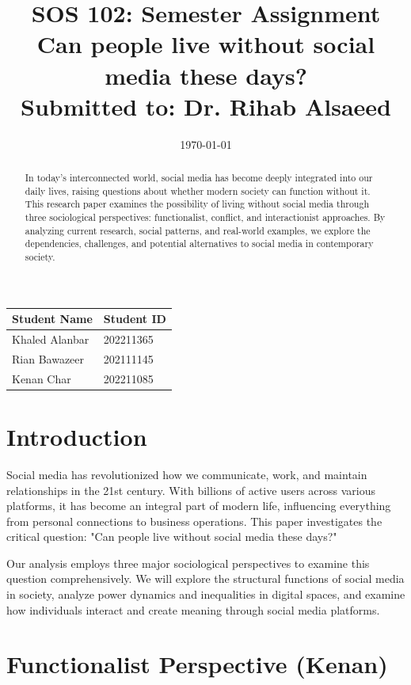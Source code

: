 \documentclass{article}
\title{SOS 102: Semester Assignment\\
\large Can people live without social media these days?\\
\vspace{0.5cm}
\normalsize Submitted to: Dr. Rihab Alsaeed}
\date{\today}
\begin{document}
\maketitle

\vspace{1cm}
\begin{center}
\begin{tabular}{|p{5cm}|p{5cm}|}
\hline
\textbf{Student Name} & \textbf{Student ID} \\
\hline
Khaled Alanbar & 202211365 \\
\hline
Rian Bawazeer & 202111145 \\
\hline
Kenan Char  & 202211085 \\
\hline
\end{tabular}
\end{center}
\newpage

\begin{abstract}
\noindent
In today's interconnected world, social media has become deeply integrated into our daily lives, raising questions about whether modern society can function without it. This research paper examines the possibility of living without social media through three sociological perspectives: functionalist, conflict, and interactionist approaches. By analyzing current research, social patterns, and real-world examples, we explore the dependencies, challenges, and potential alternatives to social media in contemporary society.
\end{abstract}
\newpage

\section{Introduction}
\indent Social media has revolutionized how we communicate, work, and maintain relationships in the 21st century. With billions of active users across various platforms, it has become an integral part of modern life, influencing everything from personal connections to business operations. This paper investigates the critical question: "Can people live without social media these days?"

Our analysis employs three major sociological perspectives to examine this question comprehensively. We will explore the structural functions of social media in society, analyze power dynamics and inequalities in digital spaces, and examine how individuals interact and create meaning through social media platforms.

\section{Functionalist Perspective (Kenan)}
\end{document}
